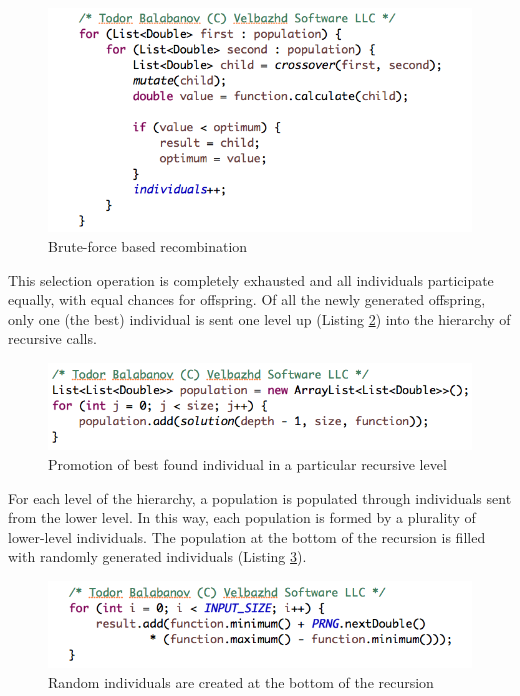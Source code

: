 \documentclass[graybox]{styles/svmult}
\begin{document}
\begin{figure}[b]
\sidecaption
\includegraphics[width=1.0\textwidth]{images/fig09}
\caption{Brute-force based recombination}
\label{fig:1}
\end{figure}

This selection operation is completely exhausted and all individuals participate equally, with equal chances for offspring. Of all the newly generated offspring, only one (the best) individual is sent one level up (Listing \ref{fig:2}) into the hierarchy of recursive calls.

\begin{figure}[b]
\sidecaption
\includegraphics[width=1.0\textwidth]{images/fig10}
\caption{Promotion of best found individual in a particular recursive level}
\label{fig:2}
\end{figure}

For each level of the hierarchy, a population is populated through individuals sent from the lower level. In this way, each population is formed by a plurality of lower-level individuals. The population at the bottom of the recursion is filled with randomly generated individuals (Listing \ref{fig:3}).

\begin{figure}[b]
\sidecaption
\includegraphics[width=1.0\textwidth]{images/fig11}
\caption{Random individuals are created at the bottom of the recursion}
\label{fig:3}
\end{figure}
\end{document}

